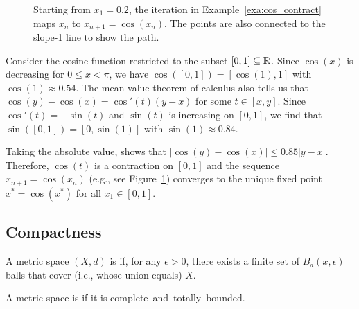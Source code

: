 \begin{figure}[t]
\centering

\vspace{-5mm}
\caption{\label{fig:cos_contract}Starting from $x_1 = 0.2$, the iteration in Example~\ref{exa:cos_contract} maps $x_n$ to $x_{n+1}= \cos(x_n)$.  The points are also connected to the slope-1 line to show the path.}
\end{figure}

\begin{example} \label{exa:cos_contract}
Consider the cosine function restricted to the subset $[0,1]\subseteq \mathbb{R}$.
Since $\cos(x)$ is decreasing for $0 \leq x < \pi$, we have $\cos([0,1]) = [\cos(1),1]$ with $\cos(1) \approx 0.54$.
The mean value theorem of calculus also tells us that $\cos(y) - \cos(x) = \cos '(t) (y-x)$ for some $t\in [x,y]$.
Since $\cos '(t) = -\sin(t)$ and $\sin(t)$ is increasing on $[0,1]$, we find that $\sin([0,1]) = [0,\sin(1)]$ with $\sin(1) \approx 0.84$.

Taking the absolute value, shows that $| \cos(y) - \cos(x) | \leq 0.85 |y-x|$.
Therefore, $\cos(t)$ is a contraction on $[0,1]$ and the sequence $x_{n+1} = \cos(x_n)$ (e.g., see Figure~\ref{fig:cos_contract}) converges to the unique fixed point $x^* = \cos(x^*)$ for all $x_1 \in [0,1]$.
\end{example}



\subsection{Compactness}
\label{sec:metspace_compact}

\begin{definition}
A metric space $(X,d)$ is  if, for any $\epsilon > 0$, there exists a finite set of $B_d (x,\epsilon)$ balls that cover (i.e., whose union equals) $X$.
\end{definition}

\begin{definition}
A metric space is  if it is complete~and~totally~bounded.
\end{definition}

